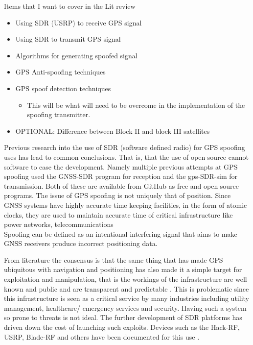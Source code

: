 \bigskip
Items that I want to cover in the Lit review
\begin{itemize}
    \item Using SDR (USRP) to receive GPS signal
    \item Using SDR to transmit GPS signal
    \item Algorithms for generating spoofed signal
    \item GPS Anti-spoofing techniques
    \item GPS spoof detection techniques
    \begin{itemize}
        \item This will be what will need to be overcome in the implementation of the spoofing transmitter.
    \end{itemize}
    \item OPTIONAL: Difference between Block II and block III satellites
\end{itemize}
\medskip
Previous research into the use of SDR (software defined radio) for GPS spoofing uses has lead to common conclusions.
That is, that the use of open source cannot  software to ease the development. Namely multiple previous attempts at GPS spoofing
used the GNSS-SDR program for reception and the gps-SDR-sim for transmission. Both of these are available from GitHub as free
and open source programs. The issue of GPS spoofing is not uniquely that of position. Since GNSS systems have highly accurate time keeping
facilities, in the form of atomic clocks, they are used to maintain accurate time of critical infrastructure like power networks, telecommunications \\

Spoofing can be defined as an intentional interfering signal that aims to make GNSS receivers produce incorrect positioning data\cite{RN8}.

\bigskip
From literature the consensus is that the same thing that has made GPS ubiquitous with navigation and 
positioning has also made it a simple target for exploitation and manipulation, that is the workings
of the infrastructure are well known and public and are transparent and predictable \cite{RN7} \cite{RN4}. This is problematic since this infrastructure
is seen as a critical service by many industries including utility management, healthcare/ emergency services and security.
Having such a system so prone to threats is not ideal. The further development of SDR platforms has driven down the cost of launching
such exploits. Devices such as the Hack-RF, USRP, Blade-RF and others have been documented for this use \cite{RN4} \cite{RN9}.

